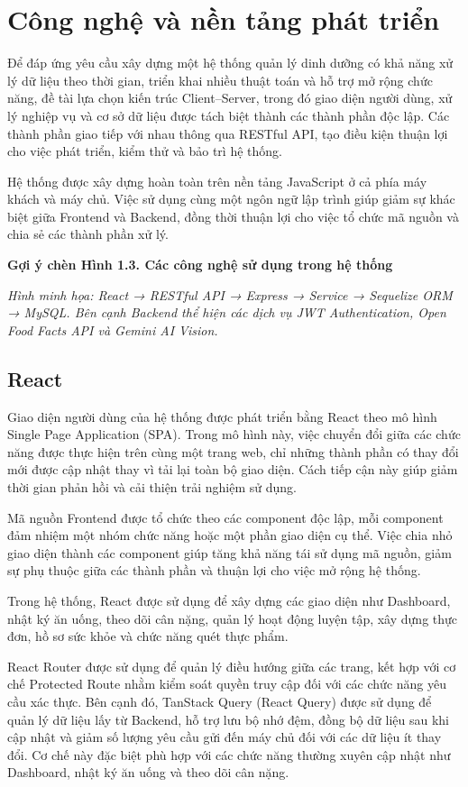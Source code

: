 \documentclass[12pt, a4paper]{report}
\begin{document}
\section{Công nghệ và nền tảng phát triển}Để đáp ứng yêu cầu xây dựng một hệ thống quản lý dinh dưỡng có khả năng xử lý dữ liệu theo thời gian, triển khai nhiều thuật toán và hỗ trợ mở rộng chức năng, đề tài lựa chọn kiến trúc Client–Server, trong đó giao diện người dùng, xử lý nghiệp vụ và cơ sở dữ liệu được tách biệt thành các thành phần độc lập. Các thành phần giao tiếp với nhau thông qua RESTful API, tạo điều kiện thuận lợi cho việc phát triển, kiểm thử và bảo trì hệ thống.

Hệ thống được xây dựng hoàn toàn trên nền tảng JavaScript ở cả phía máy khách và máy chủ. Việc sử dụng cùng một ngôn ngữ lập trình giúp giảm sự khác biệt giữa Frontend và Backend, đồng thời thuận lợi cho việc tổ chức mã nguồn và chia sẻ các thành phần xử lý.

\textbf{Gợi ý chèn Hình 1.3. Các công nghệ sử dụng trong hệ thống}

\textit{Hình minh họa: React → RESTful API → Express → Service → Sequelize ORM → MySQL. Bên cạnh Backend thể hiện các dịch vụ JWT Authentication, Open Food Facts API và Gemini AI Vision.}

\subsection{React}Giao diện người dùng của hệ thống được phát triển bằng React theo mô hình Single Page Application (SPA). Trong mô hình này, việc chuyển đổi giữa các chức năng được thực hiện trên cùng một trang web, chỉ những thành phần có thay đổi mới được cập nhật thay vì tải lại toàn bộ giao diện. Cách tiếp cận này giúp giảm thời gian phản hồi và cải thiện trải nghiệm sử dụng.

Mã nguồn Frontend được tổ chức theo các component độc lập, mỗi component đảm nhiệm một nhóm chức năng hoặc một phần giao diện cụ thể. Việc chia nhỏ giao diện thành các component giúp tăng khả năng tái sử dụng mã nguồn, giảm sự phụ thuộc giữa các thành phần và thuận lợi cho việc mở rộng hệ thống.

Trong hệ thống, React được sử dụng để xây dựng các giao diện như Dashboard, nhật ký ăn uống, theo dõi cân nặng, quản lý hoạt động luyện tập, xây dựng thực đơn, hồ sơ sức khỏe và chức năng quét thực phẩm.

React Router được sử dụng để quản lý điều hướng giữa các trang, kết hợp với cơ chế Protected Route nhằm kiểm soát quyền truy cập đối với các chức năng yêu cầu xác thực. Bên cạnh đó, TanStack Query (React Query) được sử dụng để quản lý dữ liệu lấy từ Backend, hỗ trợ lưu bộ nhớ đệm, đồng bộ dữ liệu sau khi cập nhật và giảm số lượng yêu cầu gửi đến máy chủ đối với các dữ liệu ít thay đổi. Cơ chế này đặc biệt phù hợp với các chức năng thường xuyên cập nhật như Dashboard, nhật ký ăn uống và theo dõi cân nặng.
\end{document}
